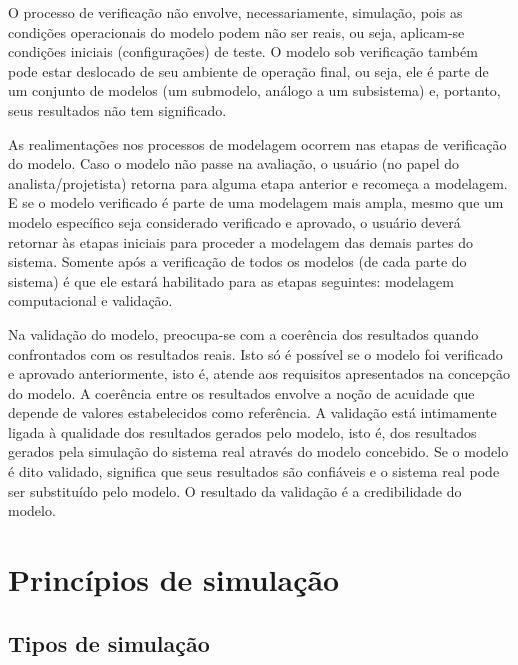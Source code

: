 \documentclass[a4paper,12pt,oneside,onecolumn]{uerj/uerj}
\begin{document}
O processo de verificação não envolve, necessariamente, simulação, pois as condições operacionais do modelo podem não ser reais, ou seja, aplicam-se condições iniciais (configurações) de teste. O modelo sob verificação também pode estar deslocado de seu ambiente de operação final, ou seja, ele é parte de um conjunto de modelos (um submodelo, análogo a um subsistema) e, portanto, seus resultados não tem significado. 

As realimentações nos processos de modelagem ocorrem nas etapas de verificação do modelo. Caso o modelo não passe na avaliação, o usuário (no papel do analista/projetista) retorna para alguma etapa anterior e recomeça a modelagem. E se o modelo verificado é parte de uma modelagem mais ampla, mesmo que um modelo específico seja considerado verificado e aprovado, o usuário deverá retornar às etapas iniciais para proceder a modelagem das demais partes do sistema. Somente após a verificação de todos os modelos (de cada parte do sistema) é que ele estará habilitado para as etapas seguintes: modelagem computacional e validação.

Na validação do modelo, preocupa-se com a coerência dos resultados quando confrontados com os resultados reais. Isto só é possível se o modelo foi verificado e aprovado anteriormente, isto é, atende aos requisitos apresentados na concepção do modelo. A coerência entre os resultados envolve a noção de acuidade que depende de valores estabelecidos como referência. A validação está intimamente ligada à qualidade dos resultados gerados pelo modelo, isto é, dos resultados gerados pela simulação do sistema real através do modelo concebido. Se o modelo é dito validado, significa que seus resultados são confiáveis e o sistema real pode ser substituído pelo modelo. O resultado da validação é a credibilidade do modelo.

\chapter{Princípios de simulação}

\section{Tipos de simulação}
\end{document}
